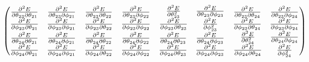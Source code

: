 \documentclass[9pt]{article}
\begin{document}
\begin{equation*}
\begin{pmatrix}
\begin{matrix}
			\pdv{E}{\theta_{23}}{\theta_{21}} & \pdv{E}{\theta_{23}}{\phi_{21}} \\
			\pdv{E}{\phi_{23}}{\theta_{21}} & \pdv{E}{\phi_{23}}{\phi_{21}} 
		\end{matrix} & 
		\begin{matrix} 
			\pdv{E}{\theta_{23}}{\theta_{22}} & \pdv{E}{\theta_{23}}{\phi_{22}} \\
			\pdv{E}{\phi_{23}}{\theta_{22}} & \pdv{E}{\phi_{23}}{\phi_{22}} 
		\end{matrix}&
		\begin{matrix} 
			\pdv[2]{E}{\theta_{23}} & \pdv{E}{\theta_{23}}{\phi_{23}} \\
			\pdv{E}{\phi_{23}}{\theta_{23}} & \pdv[2]{E}{\phi_{23}} 
		\end{matrix}&
		\begin{matrix} 
			\pdv{E}{\theta_{23}}{\theta_{24}} & \pdv{E}{\theta_{23}}{\phi_{24}} \\
			\pdv{E}{\phi_{23}}{\theta_{24}} & \pdv{E}{\phi_{23}}{\phi_{24}} 
		\end{matrix}\\
		\begin{matrix} 
			\pdv{E}{\theta_{24}}{\theta_{21}} & \pdv{E}{\theta_{24}}{\phi_{21}} \\
			\pdv{E}{\phi_{24}}{\theta_{21}} & \pdv{E}{\phi_{24}}{\phi_{21}} 
		\end{matrix} & 
		\begin{matrix} 
			\pdv{E}{\theta_{24}}{\theta_{22}} & \pdv{E}{\theta_{24}}{\phi_{22}} \\
			\pdv{E}{\phi_{24}}{\theta_{22}} & \pdv{E}{\phi_{24}}{\phi_{22}} 
		\end{matrix}&
		\begin{matrix} 
			\pdv{E}{\theta_{24}}{\theta_{23}} & \pdv{E}{\theta_{24}}{\phi_{23}} \\
			\pdv{E}{\phi_{24}}{\theta_{23}} & \pdv{E}{\phi_{24}}{\phi_{23}}
		\end{matrix}&
		\begin{matrix} 
			\pdv[2]{E}{\theta_{24}} & \pdv{E}{\theta_{24}}{\phi_{24}} \\
			\pdv{E}{\phi_{24}}{\theta_{24}} & \pdv[2]{E}{\phi_{24}} 
		\end{matrix}
	\end{pmatrix}
\end{equation*}
\end{document}
